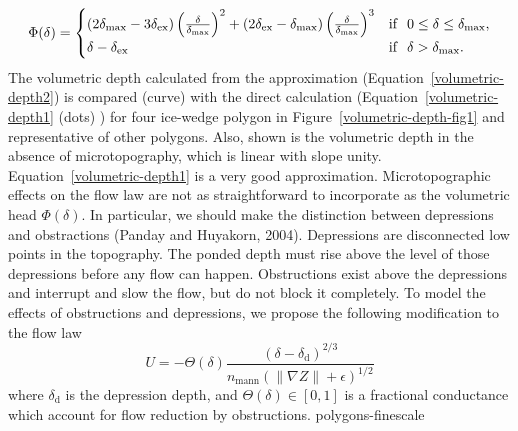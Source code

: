 \documentclass[review,11pt]{elsarticle}
\begin{document}
\begin{equation}\label{volumetric-depth2}
\Phi (\delta) =
\begin{cases} (2 \delta_\text{max} - 3 \delta_\text{ex}) \left(\frac{\delta}{\delta_\text{max}} \right )^2 + (2 \delta_\text{ex} -  \delta_\text{max}) \left(\frac{\delta}{\delta_\text{max}} \right )^3 & \text{if} \hskip 0.1in 0 \leq \delta \leq \delta_\text{max}, \\
\delta - \delta_\text{ex} & \text{if} \hskip .1in \delta > \delta_\text{max}.
\end{cases}
\end{equation}
The volumetric depth calculated from the approximation (Equation~\ref{volumetric-depth2}) is compared (curve) with the direct calculation (Equation~\ref{volumetric-depth1} (dots) ) for four ice-wedge polygon in Figure~\ref{volumetric-depth-fig1} and representative of other polygons. Also, shown is the volumetric depth in the absence of microtopography, which is linear with slope unity. Equation~\ref{volumetric-depth1} is a very good approximation.
Microtopographic effects on the flow law are not as straightforward to incorporate as the volumetric head $\Phi(\delta)$. In particular, we should make the distinction between depressions and obstractions (Panday and Huyakorn, 2004). Depressions are disconnected low points in the topography. The ponded depth must rise above the level of those depressions before any flow can happen. Obstructions exist above the depressions and interrupt and slow the flow, but do not block it completely.
To model the effects of obstructions and depressions, we propose the following modification to the flow law
\begin{equation}
U = - \Theta(\delta) \frac{(\delta - \delta_\text{d})^{2/3}}{n_\text{mann} (\| \nabla Z \| +\epsilon)^{1/2}}
\end{equation}
where $\delta_\text{d}$ is the depression depth, and $\Theta(\delta) \in [0,1]$ is a fractional conductance which account for flow reduction by obstructions.
polygons-finescale

\end{document}
